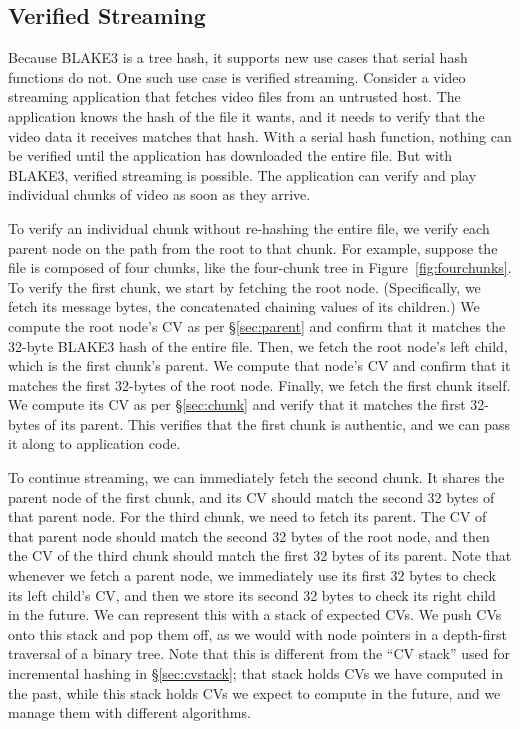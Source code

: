 \documentclass[11pt,notitlepage,a4paper]{article}
\begin{document}
\subsection{Verified Streaming}\label{sec:verifiedstreaming}

Because BLAKE3 is a tree hash, it supports new use cases that serial hash
functions do not. One such use case is verified streaming. Consider a video
streaming application that fetches video files from an untrusted host. The
application knows the hash of the file it wants, and it needs to verify that
the video data it receives matches that hash. With a serial hash function,
nothing can be verified until the application has downloaded the entire file.
But with BLAKE3, verified streaming is possible. The application can verify and
play individual chunks of video as soon as they arrive.

To verify an individual chunk without re-hashing the entire file, we verify
each parent node on the path from the root to that chunk. For example, suppose
the file is composed of four chunks, like the four-chunk tree in
Figure~\ref{fig:fourchunks}. To verify the first chunk, we start by fetching
the root node. (Specifically, we fetch its message bytes, the concatenated
chaining values of its children.) We compute the root node's CV as per
\S\ref{sec:parent} and confirm that it matches the 32-byte BLAKE3 hash of the
entire file. Then, we fetch the root node's left child, which is the first
chunk's parent. We compute that node's CV and confirm that it matches the first
32-bytes of the root node. Finally, we fetch the first chunk itself. We compute
its CV as per \S\ref{sec:chunk} and verify that it matches the first 32-bytes
of its parent. This verifies that the first chunk is authentic, and we can pass
it along to application code.

To continue streaming, we can immediately fetch the second chunk. It shares the
parent node of the first chunk, and its CV should match the second 32 bytes of
that parent node. For the third chunk, we need to fetch its parent. The CV of
that parent node should match the second 32 bytes of the root node, and then
the CV of the third chunk should match the first 32 bytes of its parent. Note
that whenever we fetch a parent node, we immediately use its first 32 bytes to
check its left child's CV, and then we store its second 32 bytes to check its
right child in the future. We can represent this with a stack of expected CVs.
We push CVs onto this stack and pop them off, as we would with node pointers in
a depth-first traversal of a binary tree. Note that this is different from the
``CV stack'' used for incremental hashing in \S\ref{sec:cvstack}; that stack
holds CVs we have computed in the past, while this stack holds CVs we expect to
compute in the future, and we manage them with different algorithms.
\end{document}
